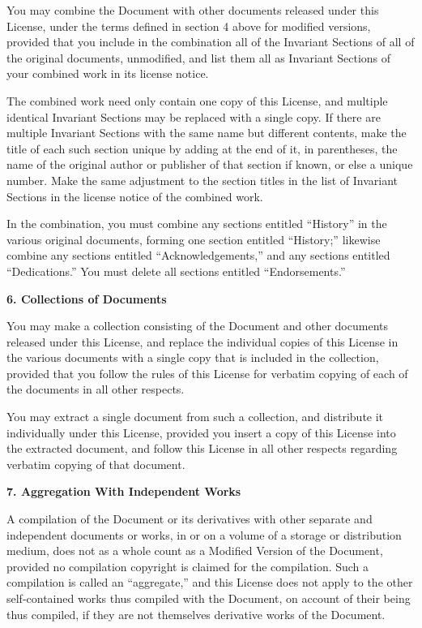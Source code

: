 \documentclass{doc}
\begin{document}
You may combine the Document with other documents released under this
License, under the terms defined in section 4 above for modified
versions, provided that you include in the combination all of the
Invariant Sections of all of the original documents, unmodified, and
list them all as Invariant Sections of your combined work in its
license notice.

The combined work need only contain one copy of this License, and
multiple identical Invariant Sections may be replaced with a single
copy.  If there are multiple Invariant Sections with the same name but
different contents, make the title of each such section unique by
adding at the end of it, in parentheses, the name of the original
author or publisher of that section if known, or else a unique number.
Make the same adjustment to the section titles in the list of
Invariant Sections in the license notice of the combined work.

In the combination, you must combine any sections entitled ``History''
in the various original documents, forming one section entitled
``History;'' likewise combine any sections entitled ``Acknowledgements,''
and any sections entitled ``Dedications.''  You must delete all sections
entitled ``Endorsements.''


\noindent\textbf{6. Collections of Documents}

You may make a collection consisting of the Document and other documents
released under this License, and replace the individual copies of this
License in the various documents with a single copy that is included in
the collection, provided that you follow the rules of this License for
verbatim copying of each of the documents in all other respects.

You may extract a single document from such a collection, and distribute
it individually under this License, provided you insert a copy of this
License into the extracted document, and follow this License in all
other respects regarding verbatim copying of that document.



\noindent\textbf{7. Aggregation With Independent Works}

A compilation of the Document or its derivatives with other separate
and independent documents or works, in or on a volume of a storage or
distribution medium, does not as a whole count as a Modified Version
of the Document, provided no compilation copyright is claimed for the
compilation.  Such a compilation is called an ``aggregate,'' and this
License does not apply to the other self-contained works thus compiled
with the Document, on account of their being thus compiled, if they
are not themselves derivative works of the Document.
\end{document}
